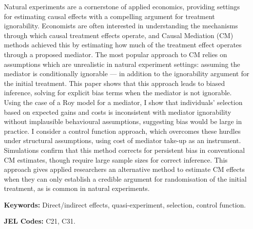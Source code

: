 \noindent
Natural experiments are a cornerstone of applied economics, providing settings for estimating causal effects with a compelling argument for treatment ignorability.
Economists are often interested in understanding the mechanisms through which causal treatment effects operate, and Causal Mediation (CM) methods achieved this by estimating how much of the treatment effect operates through a proposed mediator.
The most popular approach to CM relies on assumptions which are unrealistic in natural experiment settings: assuming the mediator is conditionally ignorable --- in addition to the ignorability argument for the initial treatment.
This paper shows that this approach leads to biased inference, solving for explicit bias terms when the mediator is not ignorable.
Using the case of a Roy model for a mediator, I show that individuals' selection based on expected gains and costs is inconsistent with mediator ignorability without implausible behavioural assumptions, suggesting bias would be large in practice.
I consider a control function approach, which overcomes these hurdles under structural assumptions, using cost of mediator take-up as an instrument.
Simulations confirm that this method corrects for persistent bias in conventional CM estimates, though require large sample sizes for correct inference.
This approach gives applied researchers an alternative method to estimate CM effects when they can only establish a credible argument for randomisation of the initial treatment, as is common in natural experiments.

\vspace{0.5cm}
\noindent
\textbf{Keywords:}
Direct/indirect effects, quasi-experiment, selection, control function.

\vspace{0.1cm}
\noindent
\textbf{JEL Codes:}
C21, C31.

